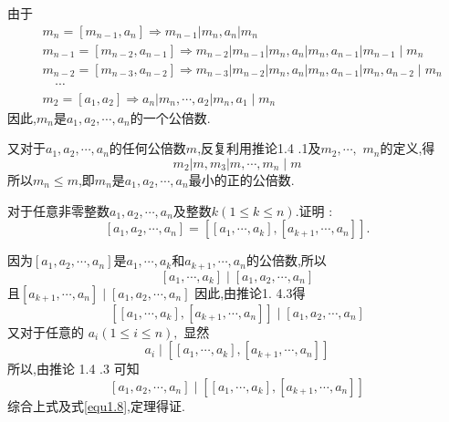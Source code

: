 \proof 由于
\begin{equation*}
	\begin{split}
		&m_{n}=\left[m_{n-1}, a_{n}\right] \Rightarrow m_{n-1}\left|m_{n}, a_{n}\right| m_{n} \\
		&m_{n-1}=\left[m_{n-2}, a_{n-1}\right] \Rightarrow m_{n-2}\left|m_{n-1}\right| m_{n}, a_{n}\left|m_{n}, a_{n-1}\right| m_{n-1} \mid m_{n} \\
		&m_{n-2}=\left[m_{n-3}, a_{n-2}\right] \Rightarrow m_{n-3}\left|m_{n-2}\right| m_{n}, a_{n}\left|m_{n}, a_{n-1}\right| m_{n}, a_{n-2} \mid m_{n} \\
		&\quad \cdots \\
		&m_{2}=\left[a_{1}, a_{2}\right] \Rightarrow a_{n}\left|m_{n}, \cdots, a_{2}\right| m_{n}, a_{1} \mid m_{n}
	\end{split}
\end{equation*}
因此,$m_{n}$是$a_{1}, a_{2}, \cdots, a_{n}$的一个公倍数.

又对于$a_{1}, a_{2}, \cdots, a_{n}$的任何公倍数$m$,反复利用推论1.4 .1及$m_{2}, \cdots,$ $ m_{n}$的定义,得
\begin{equation*}
	m_{2}\left|m, m_{3}\right| m, \cdots, m_{n} \mid m
\end{equation*}
所以$m_{n} \leqslant m$,即$m_{n}$是$a_{1}, a_{2}, \cdots, a_{n}$最小的正的公倍数. 

\theorem [定理1.4.4] 对于任意非零整数$a_{1}, a_{2}, \cdots, a_{n}$及整数$k(1 \leqslant k \leqslant n)$.证明 :
\begin{equation*}
	\left[a_{1}, a_{2}, \cdots, a_{n}\right]=\left[\left[a_{1}, \cdots, a_{k}\right],\left[a_{k+1}, \cdots, a_{n}\right]\right].
\end{equation*}

\proof 因为$\left[a_{1}, a_{2}, \cdots, a_{n}\right]$是$a_{1}, \cdots, a_{k}$和$a_{k+1}, \cdots, a_{n}$的公倍数,所以
\begin{equation*}
	\left[a_{1}, \cdots, a_{k}\right] \mid\left[a_{1}, a_{2}, \cdots, a_{n}\right]
\end{equation*}
且$\left[a_{k+1}, \cdots, a_{n}\right] \mid\left[a_{1}, a_{2}, \cdots, a_{n}\right]$
因此,由推论1. 4.3得
\begin{equation}\label{equ1.8}
	\left[\left[a_{1}, \cdots, a_{k}\right],\left[a_{k+1}, \cdots, a_{n}\right]\right] \mid\left[a_{1}, a_{2}, \cdots, a_{n}\right]
\end{equation}
又对于任意的 $a_{i}(1 \leqslant i \leqslant n),$ 显然
\begin{equation*}
	a_{i} \mid\left[\left[a_{1}, \cdots, a_{k}\right],\left[a_{k+1}, \cdots, a_{n}\right]\right]
\end{equation*}
所以,由推论 1.4 .3 可知
\begin{equation*}
	\left[a_{1}, a_{2}, \cdots, a_{n}\right] \mid\left[\left[a_{1}, \cdots, a_{k}\right],\left[a_{k+1}, \cdots, a_{n}\right]\right]
\end{equation*}
综合上式及式\eqref{equ1.8},定理得证. 

